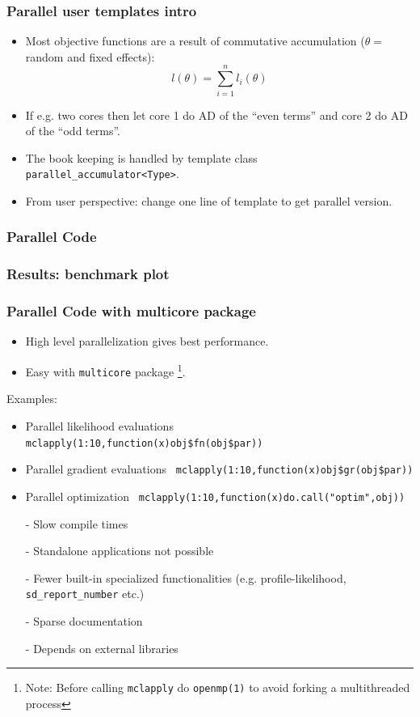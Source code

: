 \documentclass[compress]{beamer}
\begin{document}
\begin{frame}
  \frametitle{Parallel user templates intro}
  \begin{itemize}
  \item Most objective functions are a result of commutative
    accumulation ($\theta=$ random and fixed effects):
    \[l(\theta) = \sum_{i=1}^n l_i(\theta)\]
  \item If e.g. two cores then let core 1 do AD of the ``even terms'' and
    core 2 do AD of the ``odd terms''.
  \item The book keeping is handled by template class
    \texttt{parallel\_accumulator<Type>}.
  \item From user perspective: change one line of template to get
    parallel version.
  \end{itemize}
\end{frame}

\begin{frame}
  \frametitle{Parallel Code}
\end{frame}

\begin{frame}
  \frametitle{Results: benchmark plot}
\end{frame}


\begin{frame}
  \frametitle{Parallel Code with multicore package}
  \begin{itemize}
  \item High level parallelization gives best performance.
  \item Easy with \texttt{multicore} package \footnote{Note: Before
      calling \texttt{mclapply} do \texttt{openmp(1)} to avoid forking a
      multithreaded process}.
  \end{itemize}
  Examples:
  \begin{itemize}
  \item Parallel likelihood evaluations \texttt{
      mclapply(1:10,function(x)obj\$fn(obj\$par))}
  \item Parallel gradient evaluations \texttt{
      mclapply(1:10,function(x)obj\$gr(obj\$par))}
  \item Parallel optimization \texttt{
      mclapply(1:10,function(x)do.call("optim",obj))}
  \end{itemize}
\end{frame}


\begin{frame}
  \begin{itemize}
    \item[-] Slow compile times
    \item[-] Standalone applications not possible
    \item[-] Fewer built-in specialized functionalities (e.g. profile-likelihood, \texttt{sd\_report\_number} etc.)
    \item[-] Sparse documentation
    \item[-] Depends on external libraries
  \end{itemize}
\end{frame}
\end{document}
